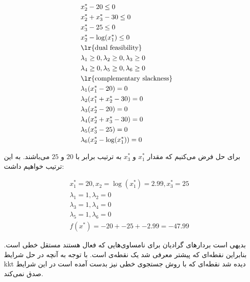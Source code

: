 \documentclass[paper=a4, fontsize=11pt]{article}
\numberwithin{equation}{section} %
\numberwithin{figure}{section} %
\numberwithin{table}{section} %
\begin{document}
\begin{equation}
\begin{aligned}
		& x^*_2 - 20 \le 0 \\
		& x^*_2 + x^*_3 - 30 \le 0 \\
		& x^*_3 - 25 \le 0 \\
		& x^*_2 - \log(x^*_1) \le 0 \\ 
		& \text{\lr{dual feasibility}} \\
		& \lambda_1 \ge 0,
		\lambda_2 \ge 0,
		\lambda_3 \ge 0 \\
		& \lambda_4 \ge 0,
		\lambda_5 \ge 0,
		\lambda_6 \ge 0 \\
		& \text{\lr{complementary slackness}} \\
		& \lambda_1(x^*_1 - 20) = 0\\
		& \lambda_2(x^*_1 + x^*_2 - 30) = 0 \\
		& \lambda_3(x^*_2 - 20) = 0 \\
		& \lambda_4(x^*_2 + x^*_3 - 30) = 0 \\
		& \lambda_5(x^*_3 - 25) = 0 \\
		& \lambda_6(x^*_2 - \log(x^*_1)) = 0 \\
	\end{aligned}					
\end{equation}

\par
	برای حل فرض می‌کنیم که مقدار $x^*_1$ و $x^*_3$ به ترتیب برابر با $20$ و $25$ می‌باشند. به این ترتیب خواهیم داشت:

\begin{equation}
	\begin{aligned}
		& x^*_1 = 20, x_2 = \log(x^*_1) = 2.99, x^*_3 = 25 \\
		& \lambda_1 = 1, \lambda_2 = 0 \\
		& \lambda_3 = 1, \lambda_4 = 0 \\
		& \lambda_5 = 1, \lambda_6 = 0 \\
		& f(x^*) = -20 + -25 + -2.99 = -47.99
	\end{aligned}					
\end{equation}

\par
	بدیهی است بردارهای گرادیان برای نامساوی‌هایی که فعال هستند مستقل خطی است. بنابراین نقطه‌ای که پیشتر معرفی شد یک نقطه‌ی  است.
	با توجه به آنچه در حل شرایط kkt دیده شد نقطه‌ای که با روش جستجوی خطی نیز بدست آمده است در این شرایط صدق نمی‌کند.
\end{document}
